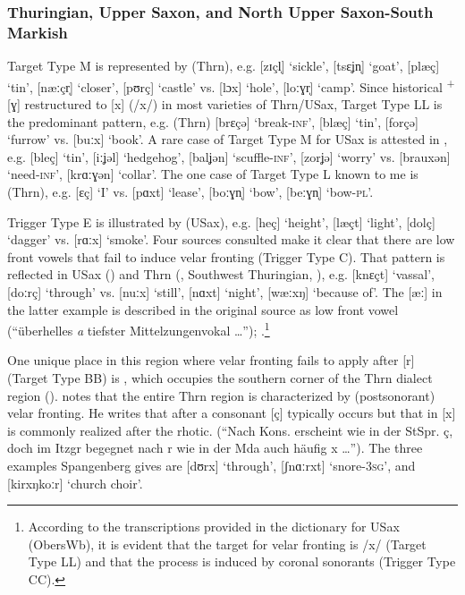 \subsubsection{Thuringian, Upper Saxon, and North Upper Saxon-South Markish}\largerpage[2]
Target Type M is represented by  (Thrn), e.g. [zɪçl̩] ‘sickle’, [tsɛʝn̩] ‘goat’, [plæç] ‘tin’, [næːçr̩] ‘closer’, [pʊrç] ‘castle’ vs. [lɔx] ‘hole’, [loːɣr̩] ‘camp’. Since historical \textsuperscript{+}[ɣ] restructured to [x] (/x/) in most varieties of Thrn/USax, Target Type LL is the predominant pattern, e.g.  (Thrn) [brɛçə] ‘break\textsc{{}-inf}’, [blæç] ‘tin’, [forçə] ‘furrow’ vs. [buːx] ‘book’. A rare case of Target Type M for USax is attested in , e.g. [bleç] ‘tin’, [iːʝəl] ‘hedgehog’, [balʝən] ‘scuffle\textsc{{}-inf}’, [zorʝə] ‘worry’ vs. [brauxən] ‘need\textsc{{}-inf}’, [krɑːɣən] ‘collar’. The one case of Target Type L known to me is  (Thrn), e.g. [ɛç] ‘I’ vs. [pɑxt] ‘lease’, [boːɣn̩] ‘bow’, [beːɣn̩] ‘bow-\textsc{pl}’.

Trigger Type E is illustrated by  (USax), e.g. [heç] ‘height’, [læçt] ‘light’, [dolç] ‘dagger’ vs. [rɑːx] ‘smoke’. Four sources consulted make it clear that there are low front vowels that fail to induce velar fronting (Trigger Type C). That pattern is reflected in USax () and Thrn (, Southwest Thuringian, ), e.g.  [knɛçt] ‘vassal’, [doːrç] ‘through’ vs. [nuːx] ‘still’, [nɑxt] ‘night’, [wæːxŋ] ‘because of’. The [æː] in the latter example is described in the original source as low front vowel (“überhelles \textit{a} tiefster Mittelzungenvokal …”); \citet[43]{Bergmann1965}.{\footnote{According to the transcriptions provided in the dictionary for USax (ObersWb), it is evident that the target for velar fronting is /x/ (Target Type LL) and that the process is induced by coronal sonorants (Trigger Type CC).}}

One unique place in this region where velar fronting fails to apply after [r] (Target Type BB) is , which occupies the southern corner of the Thrn dialect region (). \citet[128]{Spangenberg1989} notes that the entire Thrn region is characterized by (postsonorant) velar fronting. He writes that after a consonant [ç] typically occurs but that in  [x] is commonly realized after the rhotic. (“Nach Kons. erscheint wie in der StSpr. ç, doch im Itzgr begegnet nach r wie in der Mda auch häufig x …”). The three examples Spangenberg gives are [dʊrx] ‘through’, [ʃnɑːrxt] ‘snore-3\textsc{sg}’, and [kirxŋkoːr] ‘church choir’.

